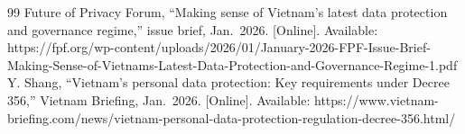 \begin{thebibliography}{99}
 Future of Privacy Forum, ``Making sense of Vietnam's latest data protection and governance regime,'' issue brief, Jan.~2026. {[}Online{]}. Available: https://fpf.org/wp-content/uploads/2026/01/January-2026-FPF-Issue-Brief-Making-Sense-of-Vietnams-Latest-Data-Protection-and-Governance-Regime-1.pdf
 Y. Shang, ``Vietnam's personal data protection: Key requirements under Decree 356,'' Vietnam Briefing, Jan.~2026. {[}Online{]}. Available: https://www.vietnam-briefing.com/news/vietnam-personal-data-protection-regulation-decree-356.html/
\end{thebibliography}
